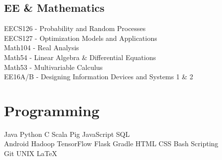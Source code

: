 \documentclass[]{format}
\begin{document}
\begin{minipage}[t]{0.33\textwidth}
\subsection{EE \& Mathematics}
EECS126 - Probability and Random Processes \\
EECS127 - Optimization Models and Applications \\
Math104 - Real Analysis \\
Math54 - Linear Algebra \& Differential Equations \\
Math53 - Multivariable Calculus \\
EE16A/B - Designing Information Devices and Systems 1 \& 2

\sectionsep


\section{Programming}
Java \textbullet{}   Python \textbullet{} C \textbullet{} Scala \textbullet{} Pig \textbullet{} JavaScript  \textbullet{} SQL \\
Android \textbullet{} Hadoop \textbullet{} TensorFlow \textbullet{} Flask \textbullet{} Gradle \textbullet{} HTML \textbullet{} CSS \textbullet{} Bash Scripting \\
Git \textbullet{} UNIX \textbullet{} LaTeX
\sectionsep

%
%

\end{minipage} 
\hfill
\end{document}
